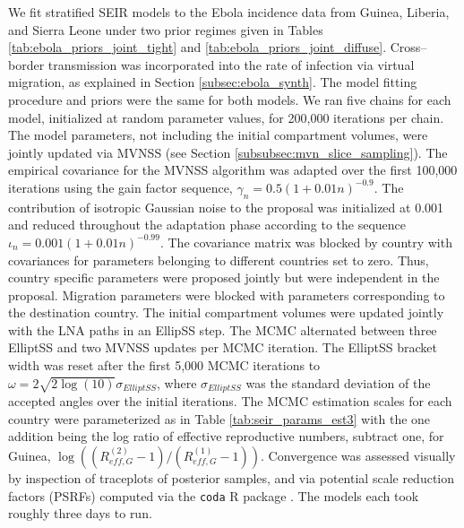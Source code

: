 We fit stratified SEIR models to the Ebola incidence data from Guinea, Liberia, and Sierra Leone under two prior regimes given in Tables \ref{tab:ebola_priors_joint_tight} and \ref{tab:ebola_priors_joint_diffuse}. Cross--border transmission was incorporated into the rate of infection via virtual migration, as explained in Section \ref{subsec:ebola_synth}.  The model fitting procedure and priors were the same for both models. We ran five chains for each model, initialized at random parameter values, for 200,000 iterations per chain. The model parameters, not including the initial compartment volumes, were jointly updated via MVNSS (see Section \ref{subsubsec:mvn_slice_sampling}). The empirical covariance for the MVNSS algorithm was adapted over the first 100,000 iterations using the gain factor sequence, $\gamma_n = 0.5(1 + 0.01n)^{-0.9}$. The contribution of isotropic Gaussian noise to the proposal was initialized at 0.001 and reduced throughout the adaptation phase according to the sequence $ \iota_n = 0.001(1 + 0.01n)^{-0.99} $. The covariance matrix was blocked by country with covariances for parameters belonging to different countries set to zero. Thus, country specific parameters were proposed jointly but were independent in the proposal. Migration parameters were blocked with parameters corresponding to the destination country. The initial compartment volumes were updated jointly with the LNA paths in an EllipSS step. The MCMC alternated between three ElliptSS and two MVNSS updates per MCMC iteration. The ElliptSS bracket width was reset after the first 5,000 MCMC iterations to $ \omega = 2\sqrt{2\log(10)}\sigma_{ElliptSS}$, where $ \sigma_{ElliptSS} $ was the standard deviation of the accepted angles over the initial iterations. The MCMC estimation scales for each country were parameterized as in Table \ref{tab:seir_params_est3} with the one addition being the log ratio of effective reproductive numbers, subtract one, for Guinea, $ \log\left ((R_{eff,G}^{(2)}-1)/(R_{eff,G}^{(1)}-1)\right ) $. Convergence was assessed visually by inspection of traceplots of posterior samples, and via potential scale reduction factors (PSRFs) \cite{brooks1998general} computed via the \texttt{coda} R package \cite{codapackage}. The models each took roughly three days to run. 

